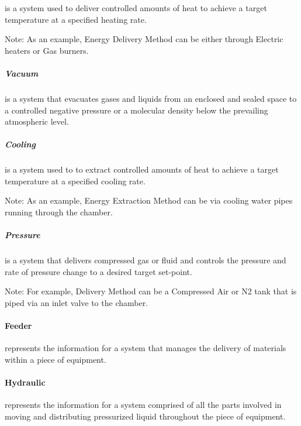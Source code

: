  is a system used to deliver controlled amounts of heat to achieve a target temperature at a specified heating rate.

Note: As an example, Energy Delivery Method can be either through Electric heaters or Gas burners.



\subparagraph{Vacuum}\mbox{}
\label{sec:Vacuum}


 is a system that evacuates gases and liquids from an enclosed and sealed space to a controlled negative pressure or a molecular density below the prevailing atmospheric level.



\subparagraph{Cooling}\mbox{}
\label{sec:Cooling}


 is a system used to to extract controlled amounts of heat to achieve a target temperature at a specified cooling rate.

Note: As an example, Energy Extraction Method can be via cooling water pipes running through the chamber.



\subparagraph{Pressure}\mbox{}
\label{sec:Pressure}


 is a system that delivers compressed gas or fluid and controls the pressure and rate of pressure change to a desired target set-point.

Note: For example, Delivery Method can be a Compressed Air or N2 tank that is piped via an inlet valve to the chamber.



\paragraph{Feeder}\mbox{}
\label{sec:Feeder}


 represents the information for a system that manages the delivery of materials within a piece of equipment.



\paragraph{Hydraulic}\mbox{}
\label{sec:Hydraulic}


 represents the information for a system comprised of all the parts involved in moving and distributing pressurized liquid throughout the piece of equipment.



